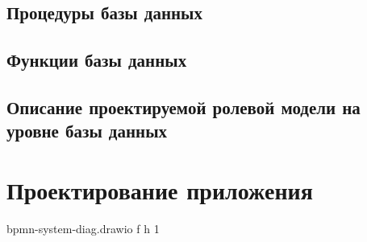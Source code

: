 \subsection{Процедуры базы данных}


\subsection{Функции базы данных}



\subsection{Описание проектируемой ролевой модели на уровне базы данных}

\clearpage

\section{Проектирование приложения}


{bpmn-system-diag.drawio} %
{f} %
{h} %
{1\textwidth} %
{} %

